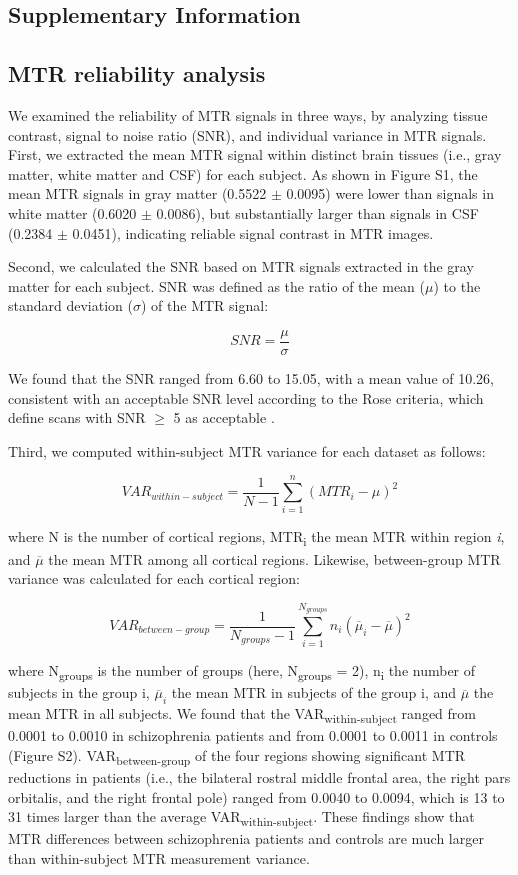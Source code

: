 \newpage
\begin{refsection}
\section*{Supplementary Information}
\subsection*{MTR reliability analysis}
We examined the reliability of MTR signals in three ways, by analyzing tissue contrast, signal to noise ratio (SNR), and individual variance in MTR signals. First, we extracted the mean MTR signal within distinct brain tissues (i.e., gray matter, white matter and CSF) for each subject. As shown in Figure S1, the mean MTR signals in gray matter (0.5522 $\pm$ 0.0095) were lower than signals in white matter (0.6020 $\pm$ 0.0086), but substantially larger than signals in CSF (0.2384 $\pm$ 0.0451), indicating reliable signal contrast in MTR images.

Second, we calculated the SNR based on MTR signals extracted in the gray matter for each subject. SNR was defined as the ratio of the mean ($\mu$) to the standard deviation ($\sigma$) of the MTR signal:

\[SNR = \frac{\mu}{\sigma} \]

We found that the SNR ranged from 6.60 to 15.05, with a mean value of 10.26, consistent with an acceptable SNR level according to the Rose criteria, which define scans with SNR $\geq$ 5 as acceptable \citep{Bushberg2011TheEP}.

Third, we computed within-subject MTR variance for each dataset as follows:

\[VAR_{within-subject} = \frac{1}{N-1}\sum_{i=1}^{n}(MTR_{i}-\mu)^{2}\]

where N is the number of cortical regions, MTR\textsubscript{i} the mean MTR within region \textit{i}, and $\overline{\mu}$ the mean MTR among all cortical regions. Likewise, between-group MTR variance was calculated for each cortical region:

\[VAR_{between-group} = \frac{1}{N_{groups}-1} \sum_{i=1}^{N_{groups}} n_{i}(\overline{\mu}_{i} - \overline{\mu})^2\]

where N\textsubscript{groups} is the number of groups (here, N\textsubscript{groups} = 2), n\textsubscript{i} the number of subjects in the group i, $\overline{\mu}_{i}$ the mean MTR in subjects of the group i, and $\overline{\mu}$ the mean MTR in all subjects. We found that the VAR\textsubscript{within-subject} ranged from 0.0001 to 0.0010 in schizophrenia patients and from 0.0001 to 0.0011 in controls (Figure S2). VAR\textsubscript{between-group} of the four regions showing significant MTR reductions in patients (i.e., the bilateral rostral middle frontal area, the right pars orbitalis, and the right frontal pole) ranged from 0.0040 to 0.0094, which is 13 to 31 times larger than the average VAR\textsubscript{within-subject}. These findings show that MTR differences between schizophrenia patients and controls are much larger than within-subject MTR measurement variance.


\end{refsection}
